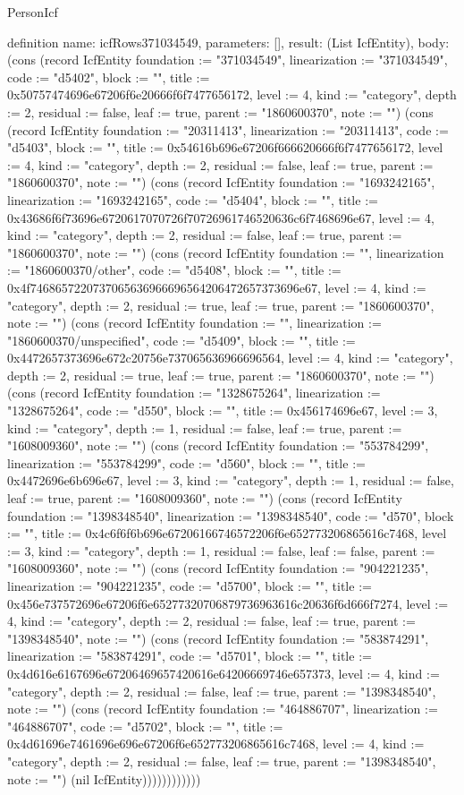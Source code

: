 \begin{lexlean}{PersonIcf}
\begin{semanticmodule}
definition{
  name: icfRows371034549,
  parameters: [],
  result: (List IcfEntity),
  body: (cons (record IcfEntity {foundation := "371034549", linearization := "371034549", code := "d5402", block := "", title := 0x50757474696e67206f6e20666f6f7477656172, level := 4, kind := "category", depth := 2, residual := false, leaf := true, parent := "1860600370", note := ""}) (cons (record IcfEntity {foundation := "20311413", linearization := "20311413", code := "d5403", block := "", title := 0x54616b696e67206f666620666f6f7477656172, level := 4, kind := "category", depth := 2, residual := false, leaf := true, parent := "1860600370", note := ""}) (cons (record IcfEntity {foundation := "1693242165", linearization := "1693242165", code := "d5404", block := "", title := 0x43686f6f73696e6720617070726f70726961746520636c6f7468696e67, level := 4, kind := "category", depth := 2, residual := false, leaf := true, parent := "1860600370", note := ""}) (cons (record IcfEntity {foundation := "", linearization := "1860600370/other", code := "d5408", block := "", title := 0x4f7468657220737065636966696564206472657373696e67, level := 4, kind := "category", depth := 2, residual := true, leaf := true, parent := "1860600370", note := ""}) (cons (record IcfEntity {foundation := "", linearization := "1860600370/unspecified", code := "d5409", block := "", title := 0x4472657373696e672c20756e737065636966696564, level := 4, kind := "category", depth := 2, residual := true, leaf := true, parent := "1860600370", note := ""}) (cons (record IcfEntity {foundation := "1328675264", linearization := "1328675264", code := "d550", block := "", title := 0x456174696e67, level := 3, kind := "category", depth := 1, residual := false, leaf := true, parent := "1608009360", note := ""}) (cons (record IcfEntity {foundation := "553784299", linearization := "553784299", code := "d560", block := "", title := 0x4472696e6b696e67, level := 3, kind := "category", depth := 1, residual := false, leaf := true, parent := "1608009360", note := ""}) (cons (record IcfEntity {foundation := "1398348540", linearization := "1398348540", code := "d570", block := "", title := 0x4c6f6f6b696e67206166746572206f6e652773206865616c7468, level := 3, kind := "category", depth := 1, residual := false, leaf := false, parent := "1608009360", note := ""}) (cons (record IcfEntity {foundation := "904221235", linearization := "904221235", code := "d5700", block := "", title := 0x456e737572696e67206f6e65277320706879736963616c20636f6d666f7274, level := 4, kind := "category", depth := 2, residual := false, leaf := true, parent := "1398348540", note := ""}) (cons (record IcfEntity {foundation := "583874291", linearization := "583874291", code := "d5701", block := "", title := 0x4d616e6167696e67206469657420616e64206669746e657373, level := 4, kind := "category", depth := 2, residual := false, leaf := true, parent := "1398348540", note := ""}) (cons (record IcfEntity {foundation := "464886707", linearization := "464886707", code := "d5702", block := "", title := 0x4d61696e7461696e696e67206f6e652773206865616c7468, level := 4, kind := "category", depth := 2, residual := false, leaf := true, parent := "1398348540", note := ""}) (nil IcfEntity))))))))))))
}


\end{semanticmodule}
\end{lexlean}
